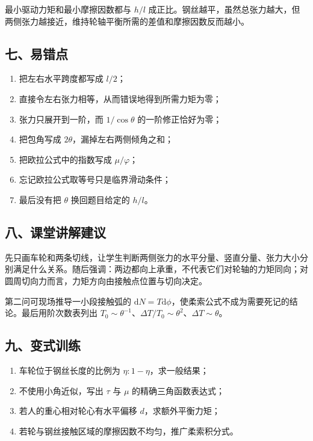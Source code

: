 \documentclass[12pt,a4paper,UTF8]{ctexart}
\newcommand{\tightlist}{\setlength{\itemsep}{0pt}\setlength{\parskip}{0pt}}
\begin{document}
最小驱动力矩和最小摩擦因数都与 \(h/l\)
成正比。钢丝越平，虽然总张力越大，但两侧张力越接近，维持轮轴平衡所需的差值和摩擦因数反而越小。

\subsection{七、易错点}\label{ux4e03ux6613ux9519ux70b9-4}

\begin{enumerate}
\def\labelenumi{\arabic{enumi}.}
\tightlist
\item
  把左右水平跨度都写成 \(l/2\)；
\item
  直接令左右张力相等，从而错误地得到所需力矩为零；
\item
  张力只展开到一阶，而 \(1/\cos\theta\) 的一阶修正恰好为零；
\item
  把包角写成 \(2\theta\)，漏掉左右两侧倾角之和；
\item
  把欧拉公式中的指数写成 \(\mu/\varphi\)；
\item
  忘记欧拉公式取等号只是临界滑动条件；
\item
  最后没有把 \(\theta\) 换回题目给定的 \(h/l\)。
\end{enumerate}

\subsection{八、课堂讲解建议}\label{ux516bux8bfeux5802ux8bb2ux89e3ux5efaux8bae-4}

先只画车轮和两条切线，让学生判断两侧张力的水平分量、竖直分量、张力大小分别满足什么关系。随后强调：两边都向上承重，不代表它们对轮轴的力矩同向；对圆周切向力而言，力矩方向由接触点位置与切向决定。

第二问可现场推导一小段接触弧的
\(\mathrm dN=T\mathrm d\phi\)，使柔索公式不成为需要死记的结论。最后用阶次数表列出
\(T_0\sim\theta^{-1}\)、\(\Delta T/T_0\sim\theta^2\)、\(\Delta T\sim\theta\)。

\subsection{九、变式训练}\label{ux4e5dux53d8ux5f0fux8badux7ec3-4}

\begin{enumerate}
\def\labelenumi{\arabic{enumi}.}
\tightlist
\item
  车轮位于钢丝长度的比例为 \(\eta:1-\eta\)，求一般结果；
\item
  不使用小角近似，写出 \(\tau\) 与 \(\mu\) 的精确三角函数表达式；
\item
  若人的重心相对轮心有水平偏移 \(d\)，求额外平衡力矩；
\item
  若轮与钢丝接触区域的摩擦因数不均匀，推广柔索积分式。
\end{enumerate}
\end{document}
